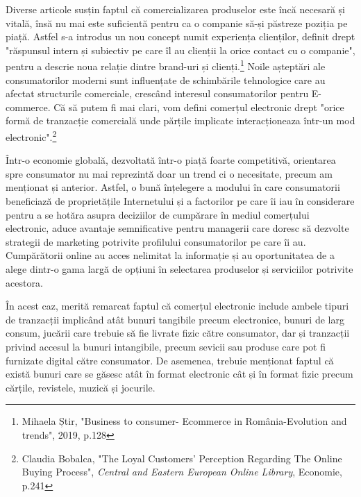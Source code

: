 \documentclass[a4paper, 12pt]{article}
\begin{document}
	\quad Diverse articole susțin faptul că comercializarea produselor este încă necesară și vitală, însă nu mai este suficientă pentru ca o companie să-și păstreze poziția pe piață. Astfel s-a introdus un nou concept numit experiența clienților, definit drept "răspunsul intern și subiectiv pe care îl au clienții la orice contact cu o companie", pentru a descrie noua relație dintre brand-uri și clienți.\footnote{Mihaela Știr, "Business to consumer- Ecommerce in România-Evolution and trends", 2019, p.128} Noile așteptări ale consumatorilor moderni sunt influențate de schimbările tehnologice care au afectat structurile comerciale, crescând interesul consumatorilor pentru E-commerce. Că să putem fi mai clari, vom defini comerțul electronic drept "orice formă de tranzacție comercială unde părțile implicate interacționeaza într-un mod electronic".\footnote{Claudia Bobalca, "The Loyal Customers’ Perception Regarding The Online Buying Process", \textit{Central and Eastern European Online Library}, Economie, p.241}	
	
	\quad Într-o economie globală, dezvoltată într-o piață foarte competitivă, orientarea spre consumator nu mai reprezintă doar un trend ci o necesitate, precum am menționat și anterior. Astfel, o bună înțelegere a modului în care consumatorii beneficiază de proprietățile Internetului și a factorilor pe care îi iau în considerare pentru a se hotăra asupra deciziilor de cumpărare în mediul comerțului electronic, aduce avantaje semnificative pentru managerii care doresc să dezvolte strategii de marketing potrivite profilului consumatorilor pe care îi au. Cumpărătorii online au acces nelimitat la informație și au oportunitatea de a alege dintr-o gama largă de opțiuni în selectarea produselor și serviciilor potrivite acestora.

	\quad În acest caz, merită remarcat faptul că comerțul electronic include ambele tipuri de tranzacții implicând atât bunuri tangibile precum electronice, bunuri de larg consum, jucării care trebuie să fie livrate fizic către consumator, dar și tranzacții privind accesul la bunuri intangibile, precum sevicii sau produse care pot fi furnizate digital către consumator. De asemenea, trebuie menționat faptul că există bunuri care se găsesc atât în format electronic cât și în format fizic precum cărțile, revistele, muzică și jocurile.
\end{document}
